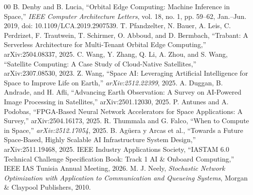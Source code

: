 \documentclass[conference]{IEEEtran}
\begin{document}
\vspace{6pt}

\begin{thebibliography}{00}
 B. Denby and B. Lucia, ``Orbital Edge Computing: Machine Inference in Space,'' \textit{IEEE Computer Architecture Letters}, vol. 18, no. 1, pp. 59--62, Jan.--Jun. 2019, doi: 10.1109/LCA.2019.2907539.
 T. Pfandzelter, N. Bauer, A. Leis, C. Perdrizet, F. Trautwein, T. Schirmer, O. Abboud, and D. Bermbach, ``Trabant: A Serverless Architecture for Multi-Tenant Orbital Edge Computing,'' arXiv:2504.08337, 2025.
 C. Wang, Y. Zhang, Q. Li, A. Zhou, and S. Wang, ``Satellite Computing: A Case Study of Cloud-Native Satellites,'' arXiv:2307.08530, 2023.
 Z. Wang, ``Space AI: Leveraging Artificial Intelligence for Space to Improve Life on Earth,'' \textit{arXiv:2512.22399}, 2025.
 A. Duggan, B. Andrade, and H. Afli, ``Advancing Earth Observation: A Survey on AI-Powered Image Processing in Satellites,'' arXiv:2501.12030, 2025.
 P. Antunes and A. Podobas, ``FPGA-Based Neural Network Accelerators for Space Applications: A Survey,'' arXiv:2504.16173, 2025.
 R. Thummala and G. Falco, ``When to Compute in Space,'' \textit{arXiv:2512.17054}, 2025.
 B. Agüera y Arcas et al., ``Towards a Future Space-Based, Highly Scalable AI Infrastructure System Design,'' arXiv:2511.19468, 2025.
 IEEE Industry Applications Society, ``IASTAM 6.0 Technical Challenge Specification Book: Track 1 AI \& Onboard Computing,'' IEEE IAS Tunisia Annual Meeting, 2026.
 M. J. Neely, \textit{Stochastic Network Optimization with Application to Communication and Queueing Systems}, Morgan \& Claypool Publishers, 2010.
\end{thebibliography}
\end{document}
